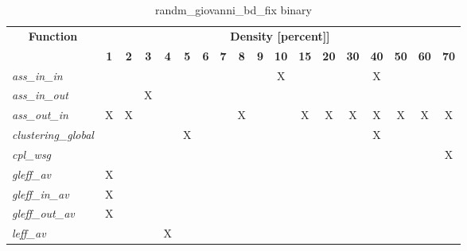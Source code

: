 \begin{table}[h] \centering \begin{tabular}{|l|c|c|c|c|c|c|c|c|c|c|c|c|c|c|c|c|c|} \hline\multicolumn{1}{|c|}{\textbf{\large{Function}}} & \multicolumn{17}{c|}{\large{\textbf{Density [percent]]}}}\\\cline{2-18}  & \textbf{1} &  \textbf{2} &  \textbf{3} &  \textbf{4} &  \textbf{5} &  \textbf{6} &  \textbf{7} &  \textbf{8} &  \textbf{9} &  \textbf{10} &  \textbf{15} &  \textbf{20} &  \textbf{30} &  \textbf{40} &  \textbf{50} &  \textbf{60} &  \textbf{70} \\ \hline   \textit{ass\_in\_in} &   &   &   &   &   &   &   &   &   & X &   &   &   & X &   &   &   \\ \hline  \textit{ass\_in\_out} &   &   & X &   &   &   &   &   &   &   &   &   &   &   &   &   &   \\ \hline  \textit{ass\_out\_in} & X & X &   &   &   &   &   & X &   &   & X & X & X & X & X & X & X \\ \hline  \textit{clustering\_global} &   &   &   &   & X &   &   &   &   &   &   &   &   & X &   &   &   \\ \hline  \textit{cpl\_wsg} &   &   &   &   &   &   &   &   &   &   &   &   &   &   &   &   & X \\ \hline  \textit{gleff\_av} & X &   &   &   &   &   &   &   &   &   &   &   &   &   &   &   &   \\ \hline  \textit{gleff\_in\_av} & X &   &   &   &   &   &   &   &   &   &   &   &   &   &   &   &   \\ \hline  \textit{gleff\_out\_av} & X &   &   &   &   &   &   &   &   &   &   &   &   &   &   &   &   \\ \hline  \textit{leff\_av} &   &   &   & X &   &   &   &   &   &   &   &   &   &   &   &   &   \\ \hline \end{tabular}\caption{randm\_giovanni\_bd\_fix binary}\label{tab:my_label} \end{table}